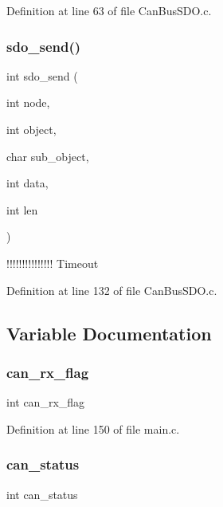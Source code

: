 Definition at line 63 of file Can\+Bus\+S\+D\+O.\+c.

\mbox{\label{_can_bus_s_d_o_8c_aacd31538a9d41269e68e6cec5b1ba3de}} 
\subsubsection{sdo\+\_\+send()}
{\footnotesize\ttfamily int sdo\+\_\+send (\begin{DoxyParamCaption}\item[{int}]{node,  }\item[{int}]{object,  }\item[{char}]{sub\+\_\+object,  }\item[{int}]{data,  }\item[{int}]{len }\end{DoxyParamCaption})}

!!!!!!!!!!!!!!! Timeout 

Definition at line 132 of file Can\+Bus\+S\+D\+O.\+c.



\subsection{Variable Documentation}
\mbox{\label{_can_bus_s_d_o_8c_a82989d280251163bcee5ffcfbf050969}} 
\subsubsection{can\+\_\+rx\+\_\+flag}
{\footnotesize\ttfamily int can\+\_\+rx\+\_\+flag}



Definition at line 150 of file main.\+c.

\mbox{\label{_can_bus_s_d_o_8c_a6bffbfe209feb02d13b8eb72cdb3cf4b}} 
\subsubsection{can\+\_\+status}
{\footnotesize\ttfamily int can\+\_\+status}



